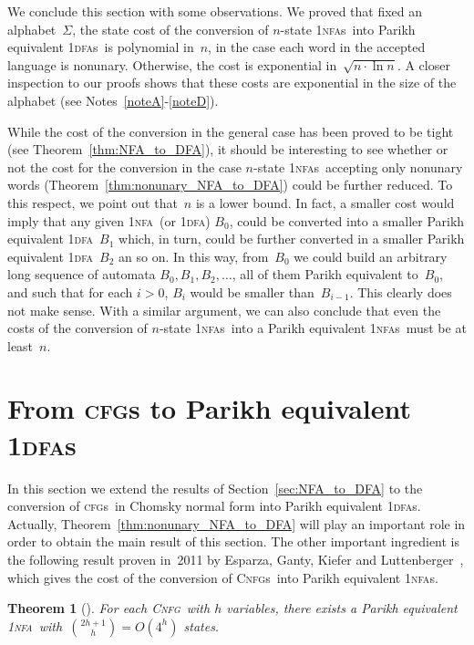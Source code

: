 \documentclass[11pt]{article}
\newcommand*{\ow}{\textsc{1}}
\newcommand*{\owdfa}{\ow\textsc{dfa}}
\newcommand*{\owdfas}{\ow\textsc{dfa}s}
\newcommand*{\ownfa}{\ow\textsc{nfa}}
\newcommand*{\ownfas}{\ow\textsc{nfa}s}
\newcommand*{\cfg}{\textsc{cfg}}
\newcommand*{\cfgs}{\textsc{cfg}s}
\newcommand*{\cnfg}{\textsc{Cnfg}}
\newcommand*{\cnfgs}{\textsc{Cnfg}s}
\newtheorem{theorem}{Theorem}[section]
\begin{document}
We conclude this section with some observations.
We proved that fixed an alphabet~$\Sigma$, the state cost of the conversion of $n$-state
\ownfas\ into Parikh equivalent \owdfas\ is polynomial in~$n$, in the case each word in the accepted
language is nonunary. Otherwise, the cost is exponential in~$\sqrt{n \cdot \ln n}$.
A closer inspection to our proofs shows that these costs are exponential in the size of the
alphabet (see Notes~\ref{noteA}-\ref{noteD}).

While the cost of the conversion in the general case has been proved to be tight (see Theorem~\ref{thm:NFA_to_DFA}),
it should be interesting to see whether or not the  cost for the conversion in the case $n$-state
\ownfas\ accepting only nonunary words (Theorem~\ref{thm:nonunary_NFA_to_DFA}) could be further reduced.
To this respect, we point out that~$n$ is a lower bound. In fact, a smaller cost would imply that any given \ownfa\ (or \owdfa)
$B_0$, could be converted into a smaller Parikh equivalent \owdfa~$B_1$ which, in turn, could be further
converted in a smaller Parikh equivalent \owdfa~$B_2$ an so on.
In this way, from~$B_0$ we could build an arbitrary long sequence of automata $B_0,B_1,B_2,\ldots$,
all of them Parikh equivalent to~$B_0$, and such that for each $i>0$, $B_i$ would be smaller than~$B_{i-1}$.
This clearly does not make sense. With a similar argument, we can also conclude that even the costs of
the conversion of  $n$-state \ownfas\ into a Parikh equivalent \ownfas\ must be at least~$n$.




\section{From \mbox{\sc\cfg}s to Parikh equivalent \mbox{\sc\owdfa}s}
	\label{sec:CFG_to_DFA}


In this section we extend the results of Section~\ref{sec:NFA_to_DFA} to
the conversion of \cfgs\ in Chomsky normal form into Parikh equivalent \owdfas.
Actually, Theorem~\ref{thm:nonunary_NFA_to_DFA} will play an important role in order
to obtain the main result of this section. The other important ingredient is the
following result proven in~2011 by Esparza, Ganty, Kiefer and Luttenberger~\cite{EsGaKiLu2011}, 
which gives the cost of the conversion of \cnfgs\ into Parikh equivalent \ownfas.

\begin{theorem}[\cite{EsGaKiLu2011}]\label{thm:EGKL2011}
	For each \cnfg\ with $h$ variables, there exists a Parikh equivalent \ownfa\ 
	with~${2h+1\choose h}=O(4^h)$ states. 
\end{theorem}
\end{document}
